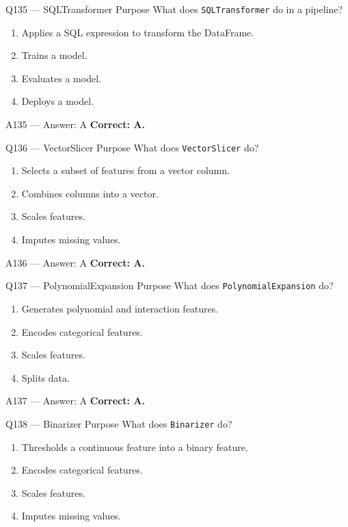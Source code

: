 \documentclass[aspectratio=169,9pt]{beamer}
\begin{document}
	\begin{frame}{Q135 --- SQLTransformer Purpose}
		What does \texttt{SQLTransformer} do in a pipeline?
		\begin{enumerate}[label=\Alph*.]
			\item Applies a SQL expression to transform the DataFrame.
			\item Trains a model.
			\item Evaluates a model.
			\item Deploys a model.
		\end{enumerate}
	\end{frame}
	
	\begin{frame}{A135 --- Answer: A}
		\textbf{Correct: A.}
	\end{frame}
	
	\begin{frame}{Q136 --- VectorSlicer Purpose}
		What does \texttt{VectorSlicer} do?
		\begin{enumerate}[label=\Alph*.]
			\item Selects a subset of features from a vector column.
			\item Combines columns into a vector.
			\item Scales features.
			\item Imputes missing values.
		\end{enumerate}
	\end{frame}
	
	\begin{frame}{A136 --- Answer: A}
		\textbf{Correct: A.}
	\end{frame}
	
	\begin{frame}{Q137 --- PolynomialExpansion Purpose}
		What does \texttt{PolynomialExpansion} do?
		\begin{enumerate}[label=\Alph*.]
			\item Generates polynomial and interaction features.
			\item Encodes categorical features.
			\item Scales features.
			\item Splits data.
		\end{enumerate}
	\end{frame}
	
	\begin{frame}{A137 --- Answer: A}
		\textbf{Correct: A.}
	\end{frame}
	
	\begin{frame}{Q138 --- Binarizer Purpose}
		What does \texttt{Binarizer} do?
		\begin{enumerate}[label=\Alph*.]
			\item Thresholds a continuous feature into a binary feature.
			\item Encodes categorical features.
			\item Scales features.
			\item Imputes missing values.
		\end{enumerate}
	\end{frame}
	
\end{document}
